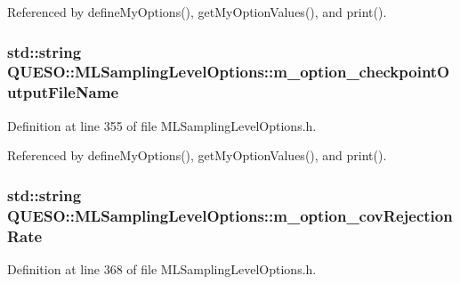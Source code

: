 Referenced by define\-My\-Options(), get\-My\-Option\-Values(), and print().

\hypertarget{class_q_u_e_s_o_1_1_m_l_sampling_level_options_ab0b21922a976c557cdcded05fcbb9a54}{
\subsubsection[{m\-\_\-option\-\_\-checkpoint\-Output\-File\-Name}]{\setlength{\rightskip}{0pt plus 5cm}std\-::string Q\-U\-E\-S\-O\-::\-M\-L\-Sampling\-Level\-Options\-::m\-\_\-option\-\_\-checkpoint\-Output\-File\-Name\hspace{0.3cm}{\ttfamily [private]}}}\label{class_q_u_e_s_o_1_1_m_l_sampling_level_options_ab0b21922a976c557cdcded05fcbb9a54}


Definition at line 355 of file M\-L\-Sampling\-Level\-Options.\-h.



Referenced by define\-My\-Options(), get\-My\-Option\-Values(), and print().

\hypertarget{class_q_u_e_s_o_1_1_m_l_sampling_level_options_a3a8c05911fea3a80ff8efe3e046ba5e9}{
\subsubsection[{m\-\_\-option\-\_\-cov\-Rejection\-Rate}]{\setlength{\rightskip}{0pt plus 5cm}std\-::string Q\-U\-E\-S\-O\-::\-M\-L\-Sampling\-Level\-Options\-::m\-\_\-option\-\_\-cov\-Rejection\-Rate\hspace{0.3cm}{\ttfamily [private]}}}\label{class_q_u_e_s_o_1_1_m_l_sampling_level_options_a3a8c05911fea3a80ff8efe3e046ba5e9}


Definition at line 368 of file M\-L\-Sampling\-Level\-Options.\-h.



